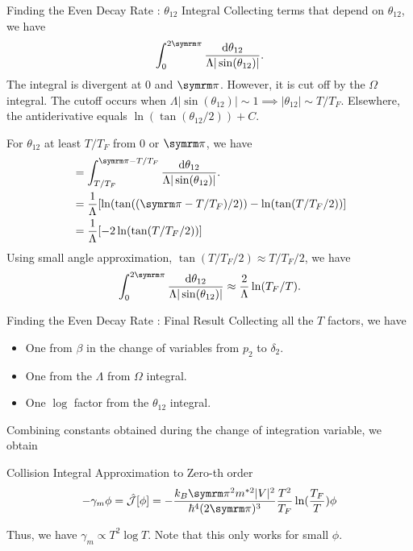 \begin{frame}{Finding the Even Decay Rate : \alert{\(\theta_{12}\) Integral}}
  Collecting terms that depend on \(\theta_{12}\), we have
  \begin{equation}
    \int_{0}^{2\cpi}\frac{\odif{\theta_{12}}}{\Lambda|\sin(\theta_{12})|}.
  \end{equation}
  The integral is divergent at \(0\) and \(\cpi\). However, it is cut off by the \(\Omega\) integral. The cutoff occurs when \(\Lambda|\sin(\theta_{12})|\sim 1 \implies |\theta_{12}|\sim T/T_F\). Elsewhere, the antiderivative equals \(\ln(\tan(\theta_{12}/2))+C\).
\end{frame}

\begin{frame}{}
  For \(\theta_{12}\) at least \(T/T_F\) from \(0\) or \(\cpi\), we have
  \begin{align}
     & = \int_{T/T_F}^{\cpi-T/T_F}\frac{\odif{\theta_{12}}}{\Lambda|\sin(\theta_{12})|}. \\
     & = \frac{1}{\Lambda}[\ln(\tan((\cpi-T/T_F)/2)) - \ln(\tan(T/T_F/2))]               \\
     & = \frac{1}{\Lambda}[-2\ln(\tan(T/T_F/2))]
  \end{align}
  Using small angle approximation, \(\tan(T/T_F/2) \approx T/T_F/2\), we have
  \begin{equation}
    \int_{0}^{2\cpi}\frac{\odif{\theta_{12}}}{\Lambda|\sin(\theta_{12})|} \approx \frac{2}{\Lambda}\ln(T_F/T).
  \end{equation}
\end{frame}

\begin{frame}{Finding the Even Decay Rate : \alert{Final Result}}
  Collecting all the \(T\) factors, we have
  \begin{itemize}
    \item One from \(\beta\) in the change of variables from \(p_2\) to \(\delta_2\).
    \item One from the \(\Lambda\) from \(\Omega\) integral.
    \item One \(\log\) factor from the \(\theta_{12}\) integral.
  \end{itemize}
  Combining constants obtained during the change of integration variable, we obtain
  \begin{blk}{Collision Integral Approximation to Zero-th order}
    \begin{equation}
      -\gamma_m \phi = \hat{\mathcal{J}}[\phi] = -\frac{k_B\cpi^2m^{*2}|V|^2}{\hbar^4(2\cpi)^3}\frac{T^2}{T_F}\ln(\frac{T_F}{T})\phi
    \end{equation}
  \end{blk}
  Thus, we have \alert{\(\gamma_m \propto T^2\log T\)}. Note that this only works for small \(\phi\).
\end{frame}

